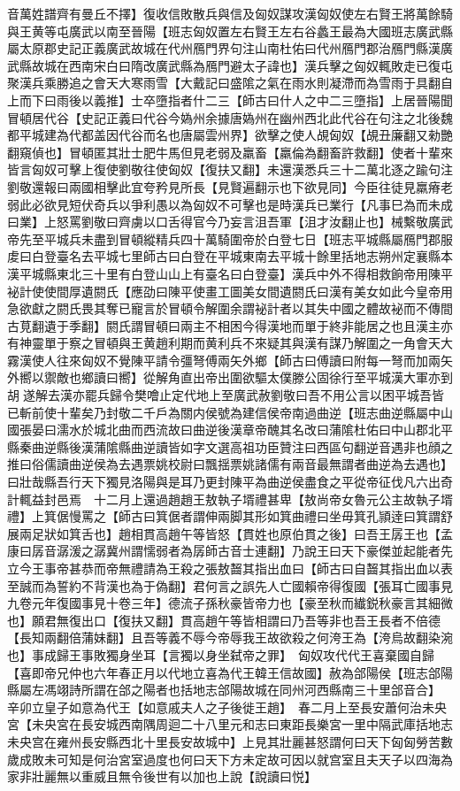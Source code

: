音萬姓譜齊有曼丘不擇】復收信敗散兵與信及匈奴謀攻漢匈奴使左右賢王將萬餘騎與王黄等屯廣武以南至晉陽【班志匈奴置左右賢王左右谷蠡王最為大國班志廣武縣屬太原郡史記正義廣武故城在代州鴈門界句注山南杜佑曰代州鴈門郡治鴈門縣漢廣武縣故城在西南宋白曰隋改廣武縣為鴈門避太子諱也】漢兵擊之匈奴輒敗走已復屯聚漢兵乘勝追之會天大寒雨雪【大戴記曰盛隂之氣在雨水則凝滯而為雪雨于具翻自上而下曰雨後以義推】士卒墮指者什二三【師古曰什人之中二三墮指】上居晉陽聞冒頓居代谷【史記正義曰代谷今媯州余據唐媯州在幽州西北此代谷在句注之北後魏都平城建為代都盖因代谷而名也唐屬雲州界】欲擊之使人覘匈奴【覘丑廉翻又勑艷翻窺偵也】冒頓匿其壯士肥牛馬但見老弱及羸畜【羸倫為翻畜許救翻】使者十輩來皆言匈奴可擊上復使劉敬往使匈奴【復扶又翻】未還漢悉兵三十二萬北逐之踰句注劉敬還報曰兩國相擊此宜夸矜見所長【見賢遍翻示也下欲見同】今臣往徒見羸瘠老弱此必欲見短伏奇兵以爭利愚以為匈奴不可擊也是時漢兵已業行【凡事巳為而未成曰業】上怒罵劉敬曰齊虜以口舌得官今乃妄言沮吾軍【沮才汝翻止也】械繫敬廣武帝先至平城兵未盡到冒頓縱精兵四十萬騎圍帝於白登七日【班志平城縣屬鴈門郡服䖍曰白登臺名去平城七里師古曰白登在平城東南去平城十餘里括地志朔州定襄縣本漢平城縣東北三十里有白登山山上有臺名曰白登臺】漢兵中外不得相救餉帝用陳平袐計使使間厚遺閼氏【應劭曰陳平使畫工圖美女間遺閼氏曰漢有美女如此今皇帝用急欲獻之閼氏畏其奪已寵言於冒頓令解圍余謂袐計者以其失中國之體故袐而不傳間古莧翻遺于季翻】閼氏謂冒頓曰兩主不相困今得漢地而單于終非能居之也且漢主亦有神靈單于察之冒頓與王黄趙利期而黄利兵不來疑其與漢有謀乃解圍之一角會天大霧漢使人往來匈奴不覺陳平請令彊弩傅兩矢外鄉【師古曰傅讀曰附每一弩而加兩矢外嚮以禦敵也鄉讀曰嚮】從解角直出帝出圍欲驅太僕滕公固徐行至平城漢大軍亦到胡遂解去漢亦罷兵歸令樊噲止定代地上至廣武赦劉敬曰吾不用公言以困平城吾皆已斬前使十輩矣乃封敬二千戶為關内侯號為建信侯帝南過曲逆【班志曲逆縣屬中山國張晏曰濡水於城北曲而西流故曰曲逆後漢章帝醜其名改曰蒲隂杜佑曰中山郡北平縣秦曲逆縣後漢蒲隂縣曲逆讀皆如字文選高祖功臣贊注曰西區句翻逆音遇非也顔之推曰俗儒讀曲逆侯為去遇票姚校尉曰飄揺票姚諸儒有兩音最無謂者曲逆為去遇也】曰壯哉縣吾行天下獨見洛陽與是耳乃更封陳平為曲逆侯盡食之平從帝征伐凡六出奇計輒益封邑焉　十二月上還過趙趙王敖執子壻禮甚卑【敖尚帝女魯元公主故執子壻禮】上箕倨慢罵之【師古曰箕倨者謂伸兩脚其形如箕曲禮曰坐毋箕孔頴逹曰箕謂舒展兩足狀如箕舌也】趙相貫高趙午等皆怒【貫姓也原伯貫之後】曰吾王孱王也【孟康曰孱音潺湲之潺冀州謂懦弱者為孱師古音士連翻】乃說王曰天下豪傑並起能者先立今王事帝甚恭而帝無禮請為王殺之張敖齧其指出血曰【師古曰自齧其指出血以表至誠而為誓約不背漢也為于偽翻】君何言之誤先人亡國賴帝得復國【張耳亡國事見九卷元年復國事見十卷三年】德流子孫秋豪皆帝力也【豪至秋而纎鋭秋豪言其細微也】願君無復出口【復扶又翻】貫高趙午等皆相謂曰乃吾等非也吾王長者不倍德【長知兩翻倍蒲妹翻】且吾等義不辱今帝辱我王故欲殺之何洿王為【洿烏故翻染涴也】事成歸王事敗獨身坐耳【言獨以身坐弑帝之罪】　匈奴攻代代王喜棄國自歸【喜即帝兄仲也六年春正月以代地立喜為代王韓王信故國】赦為郃陽侯【班志郃陽縣屬左馮翊詩所謂在郃之陽者也括地志郃陽故城在同州河西縣南三十里郃音合】　辛卯立皇子如意為代王【如意戚夫人之子後徙王趙】　春二月上至長安蕭何治未央宮【未央宮在長安城西南隅周迴二十八里元和志曰東距長樂宮一里中隔武庫括地志未央宫在雍州長安縣西北十里長安故城中】上見其壯麗甚怒謂何曰天下匈匈勞苦數歲成敗未可知是何治宮室過度也何曰天下方未定故可因以就宫室且夫天子以四海為家非壯麗無以重威且無令後世有以加也上說【說讀曰悦】


